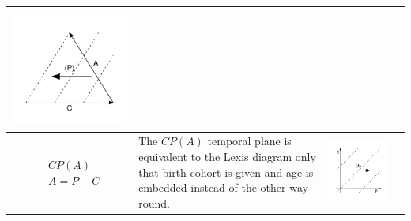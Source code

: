 \documentclass[
  12pt
]{scrartcl}
\begin{document}
\begin{center}
\begin{longtable}{m{}m{}m{}m{}}
  \includegraphics[width = \linewidth]{../fig/ACp_iso.pdf}  \\
  \midrule
  $$\begin{aligned}
    &CP(A) \\
    &A = P - C
  \end{aligned}$$ &
  The $CP(A)$ temporal plane is equivalent to the Lexis diagram only that birth cohort is given and age is embedded instead of the other way round. &
  \includegraphics[width = \linewidth]{../fig/CPa.pdf} &

\end{longtable}
\end{center}
\end{document}
